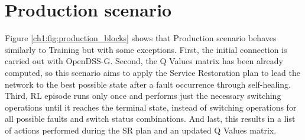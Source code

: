 \section{Production scenario}
\label{ch1:sec:production}



Figure \ref{ch1:fig:production_blocks} shows that Production scenario behaves similarly to Training but with some exceptions. First, the initial 
connection is carried out with OpenDSS-G. Second, the Q Values matrix has been already computed, 
so this scenario aims to apply the Service Restoration plan to lead the network to the best possible 
state after a fault occurrence through self-healing. Third, RL episode runs only once and performs 
just the necessary switching operations until it reaches the terminal state, instead of switching 
operations for all possible faults and switch status combinations. And last, this results in a list 
of actions performed during the SR plan and an updated Q Values matrix. 